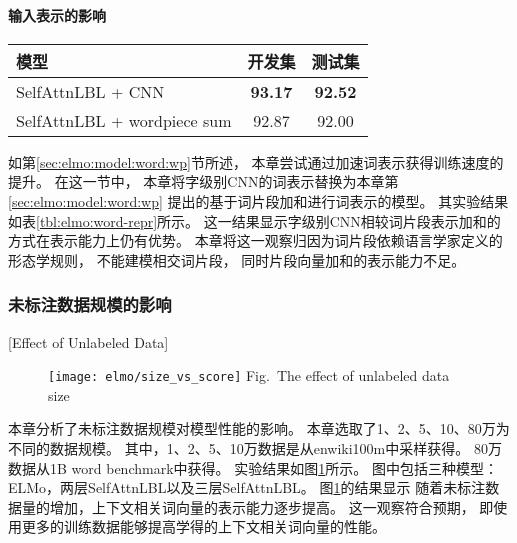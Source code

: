\paragraph{输入表示的影响}
\begin{table}[t]
	\vspace{0.5em}\centering\wuhao
	\begin{tabular}{lcc}
		\toprule[1.5pt]
		模型 & 开发集 & 测试集 \\
		\midrule[1pt]
		SelfAttnLBL + CNN & \textbf{93.17} & \textbf{92.52} \\
		SelfAttnLBL + wordpiece sum & 92.87 & 92.00\\
		\bottomrule[1.5pt]
	\end{tabular}
\end{table}

如第\ref{sec:elmo:model:word:wp}节所述，
本章尝试通过加速词表示获得训练速度的提升。
在这一节中，
本章将字级别CNN的词表示替换为本章第\ref{sec:elmo:model:word:wp}
提出的基于词片段加和进行词表示的模型。
其实验结果如表\ref{tbl:elmo:word-repr}所示。
这一结果显示字级别CNN相较词片段表示加和的方式在表示能力上仍有优势。
本章将这一观察归因为词片段依赖语言学家定义的形态学规则，
不能建模相交词片段，
同时片段向量加和的表示能力不足。

\subsubsection{未标注数据规模的影响}[Effect of Unlabeled Data]
\begin{figure}[t]
	\centering
	\texttt{[image: elmo/size\_vs\_score]}
	{Fig.~$\!$}{The effect of unlabeled data size\label{fig:elmo:ana:size-effect}
	}
\end{figure}
本章分析了未标注数据规模对模型性能的影响。
本章选取了1、2、5、10、80万为不同的数据规模。
其中，1、2、5、10万数据是从enwiki100m中采样获得。
80万数据从1B word benchmark中获得。
实验结果如图\ref{fig:elmo:ana:size-effect}所示。
图中包括三种模型：ELMo，两层SelfAttnLBL以及三层SelfAttnLBL。
图\ref{fig:elmo:ana:size-effect}的结果显示
随着未标注数据量的增加，上下文相关词向量的表示能力逐步提高。
这一观察符合预期，
即使用更多的训练数据能够提高学得的上下文相关词向量的性能。

